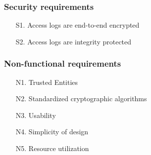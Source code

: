 \documentclass[../main.tex]{subfiles}
\begin{document}
\subsubsection{Security requirements}
\begin{itemize}
    \item [S1.] Access logs are end-to-end encrypted
    \item [S2.] Access logs are integrity protected
\end{itemize}

\subsubsection{Non-functional requirements}
\begin{itemize}
    \item [N1.] Trusted Entities
    \item [N2.] Standardized cryptographic algorithms
    \item [N3.] Usability
    \item [N4.] Simplicity of design
    \item [N5.] Resource utilization
\end{itemize}
\end{document}
